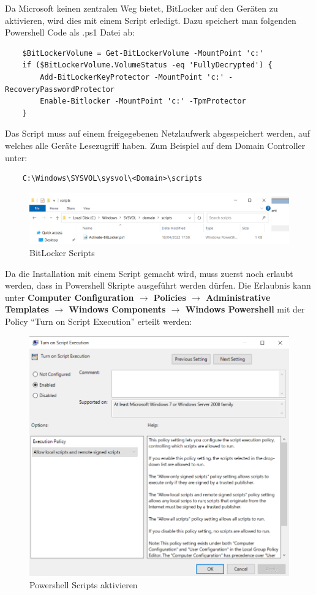 Da Microsoft keinen zentralen Weg bietet, BitLocker auf den Geräten zu aktivieren, wird dies mit einem Script erledigt.
Dazu speichert man folgenden Powershell Code als .ps1 Datei ab:
\begin{lstlisting}
    $BitLockerVolume = Get-BitLockerVolume -MountPoint 'c:'
    if ($BitLockerVolume.VolumeStatus -eq 'FullyDecrypted') {
        Add-BitLockerKeyProtector -MountPoint 'c:' -RecoveryPasswordProtector
        Enable-Bitlocker -MountPoint 'c:' -TpmProtector
    }
\end{lstlisting}
Das Script muss auf einem freigegebenen Netzlaufwerk abgespeichert werden, auf welches alle Geräte Lesezugriff haben.
Zum Beispiel auf dem Domain Controller unter:
\begin{lstlisting}
    C:\Windows\SYSVOL\sysvol\<Domain>\scripts
\end{lstlisting}
\begin{figure}[H]
    \centering
    \includegraphics[width=\linewidth]{../img/Encryption/activate-bitlocker-script.png}
    \caption{BitLocker Scripts}
\end{figure}

Da die Installation mit einem Script gemacht wird, muss zuerst noch erlaubt werden, dass in Powershell Skripte ausgeführt werden dürfen.
Die Erlaubnis kann unter \textbf{Computer Configuration $\rightarrow$ Policies $\rightarrow$ Administrative Templates $\rightarrow$ Windows Components $\rightarrow$ Windows Powershell} mit der Policy ``Turn on Script Execution'' erteilt werden:
\begin{figure}[H]
    \centering
    \includegraphics[width=\linewidth]{../img/Encryption/powershell-execution.png}
    \caption{Powershell Scripts aktivieren}
\end{figure}

